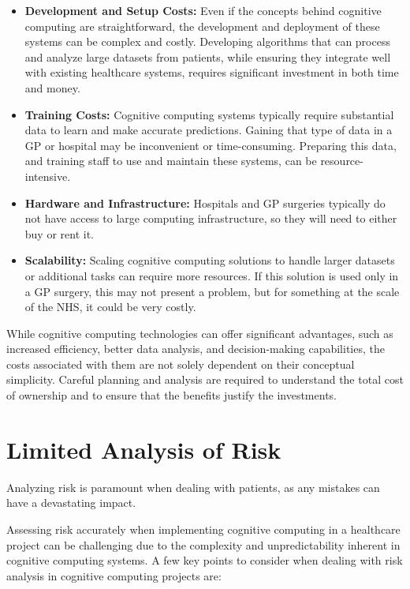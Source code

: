\documentclass{article}
\begin{document}
\begin{itemize}
\item \textbf{Development and Setup Costs:} Even if the concepts behind cognitive computing are straightforward, the development and deployment of these systems can be complex and costly. Developing algorithms that can process and analyze large datasets from patients, while ensuring they integrate well with existing healthcare systems, requires significant investment in both time and money.

\item \textbf{Training Costs:} Cognitive computing systems typically require substantial data to learn and make accurate predictions. Gaining that type of data in a GP or hospital may be inconvenient or time-consuming. Preparing this data, and training staff to use and maintain these systems, can be resource-intensive.

\item \textbf{Hardware and Infrastructure:} Hospitals and GP surgeries typically do not have access to large computing infrastructure, so they will need to either buy or rent it.

\item \textbf{Scalability:} Scaling cognitive computing solutions to handle larger datasets or additional tasks can require more resources. If this solution is used only in a GP surgery, this may not present a problem, but for something at the scale of the NHS, it could be very costly.
\end{itemize}

While cognitive computing technologies can offer significant advantages, such as increased efficiency, better data analysis, and decision-making capabilities, the costs associated with them are not solely dependent on their conceptual simplicity. Careful planning and analysis are required to understand the total cost of ownership and to ensure that the benefits justify the investments.

\section{Limited Analysis of Risk}
Analyzing risk is paramount when dealing with patients, as any mistakes can have a devastating impact.

Assessing risk accurately when implementing cognitive computing in a healthcare project can be challenging due to the complexity and unpredictability inherent in cognitive computing systems. A few key points to consider when dealing with risk analysis in cognitive computing projects are:
\end{document}
